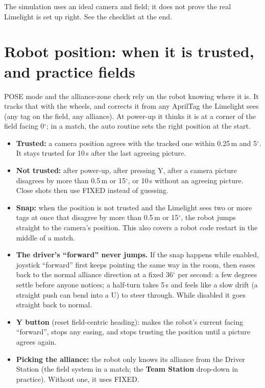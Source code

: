 \documentclass[11pt]{article}
\begin{document}
The simulation uses an ideal camera and field; it does not prove the real Limelight is set up
right. See the checklist at the end.

\section*{Robot position: when it is trusted, and practice fields}

POSE mode and the alliance-zone check rely on the robot knowing where it is. It tracks that with
the wheels, and corrects it from any AprilTag the Limelight sees (any tag on the field, any
alliance). At power-up it thinks it is at a corner of the field facing 0$^\circ$; in a match, the
auto routine sets the right position at the start.

\begin{itemize}
  \item \textbf{Trusted:} a camera position agrees with the tracked one within 0.25\,m and
    5$^\circ$. It stays trusted for 10\,s after the last agreeing picture.
  \item \textbf{Not trusted:} after power-up, after pressing Y, after a camera picture disagrees by
    more than 0.5\,m or 15$^\circ$, or 10\,s without an agreeing picture. Close shots then use FIXED
    instead of guessing.
  \item \textbf{Snap:} when the position is not trusted and the Limelight sees two or more tags at
    once that disagree by more than 0.5\,m or 15$^\circ$, the robot jumps straight to the camera's
    position. This also covers a robot code restart in the middle of a match.
  \item \textbf{The driver's ``forward'' never jumps.} If the snap happens while enabled, joystick
    ``forward'' first keeps pointing the same way in the room, then eases back to the normal
    alliance direction at a fixed 36$^\circ$ per second: a few degrees settle before anyone
    notices; a half-turn takes 5\,s and feels like a slow drift (a straight push can bend into a U)
    to steer through. While disabled it goes straight back to normal.
  \item \textbf{Y button} (reset field-centric heading): makes the robot's current facing
    ``forward'', stops any easing, and stops trusting the position until a picture agrees again.
  \item \textbf{Picking the alliance:} the robot only knows its alliance from the Driver Station
    (the field system in a match; the \textbf{Team Station} drop-down in practice). Without one, it
    uses FIXED.
\end{itemize}
\end{document}
